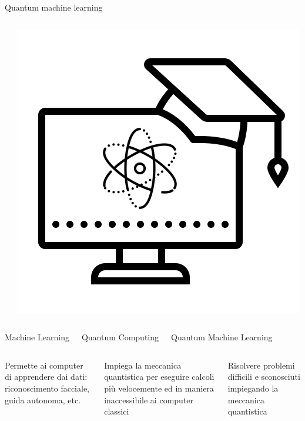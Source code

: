 \documentclass{beamer}
\begin{document}
\begin{frame}[t]{Quantum machine learning}
\begin{columns}
\begin{center}
            \end{center}
            \begin{center}
                \includegraphics[width=.8\columnwidth]{gfx/icons/quantum-machine-learning-480.png}
            \end{center}
        \end{columns}
        \vspace{-.2cm}
        \begin{columns}
            \begin{center}
                Machine Learning
            \end{center}
            \begin{center}
                Quantum Computing
            \end{center}
            \begin{center}
                Quantum Machine Learning
            \end{center}
        \end{columns}
        \begin{columns}[t]
            \begin{center}
                Permette ai computer di apprendere dai dati: riconoscimento facciale, guida autonoma, etc.
            \end{center}
            \begin{center}
                Impiega la meccanica quantistica per eseguire calcoli più velocemente ed in maniera inaccessibile ai computer classici            
            \end{center}
            \begin{center}
                Risolvere problemi difficili e sconosciuti impiegando la meccanica quantistica                
            \end{center}
        \end{columns}
    \end{frame}
\end{document}
